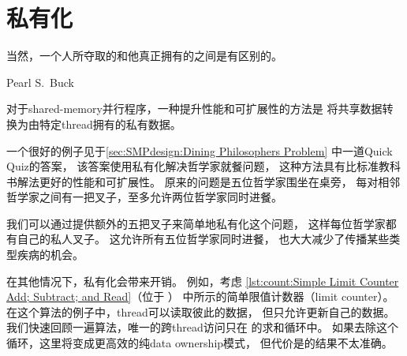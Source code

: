 \QuickQuizEnd

\section{私有化}
\label{sec:owned:Privatization}
%
\epigraph{当然，一个人所夺取的和他真正拥有的之间是有区别的。}
	 {Pearl S.~Buck}

对于shared-memory并行程序，一种提升性能和可扩展性的方法是
将共享数据转换为由特定thread拥有的私有数据。

一个很好的例子见于\cref{sec:SMPdesign:Dining Philosophers Problem}
中一道Quick Quiz的答案，
该答案使用私有化解决哲学家就餐问题，
这种方法具有比标准教科书解法更好的性能和可扩展性。
原来的问题是五位哲学家围坐在桌旁，
每对相邻哲学家之间有一把叉子，至多允许两位哲学家同时进餐。

我们可以通过提供额外的五把叉子来简单地私有化这个问题，
这样每位哲学家都有自己的私人叉子。
这允许所有五位哲学家同时进餐，
也大大减少了传播某些类型疾病的机会。

在其他情况下，私有化会带来开销。
例如，考虑
\cref{lst:count:Simple Limit Counter Add; Subtract; and Read}（位于
）
中所示的简单限值计数器（limit counter）。
在这个算法的例子中，thread可以读取彼此的数据，
但只允许更新自己的数据。
我们快速回顾一遍算法，唯一的跨thread访问只在
的求和循环中。
如果去除这个循环，这里将变成更高效的纯data ownership模式，
但代价是的结果不太准确。

